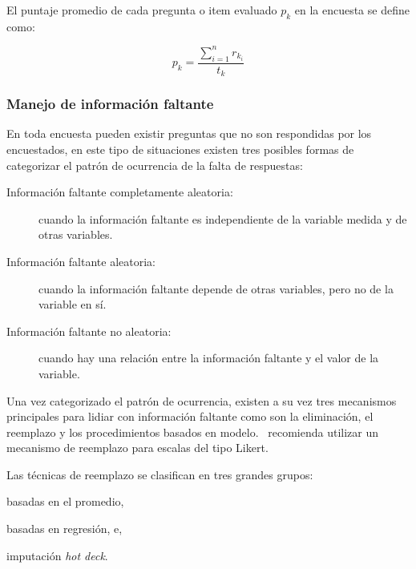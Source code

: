 El puntaje promedio de cada pregunta o item evaluado  $p_k$ en la encuesta se
define como:

\begin{equation}
p_k = \frac{\sum_{i=1}^n{r_{k_i}}}{t_k}
\end{equation}



\subsubsection{Manejo de información faltante}
\label{sec:informacion_faltante}

En toda encuesta pueden existir preguntas que no son respondidas por los encuestados, 
en este tipo de situaciones existen tres posibles formas de categorizar el 
patrón de ocurrencia de la falta de 
respuestas\cite{leite2010performance,tsikriktsis2005review}:

\begin{description}
    \item[Información faltante completamente aleatoria:] cuando la información
        faltante es independiente de la variable medida y de otras variables.
    \item[Información faltante aleatoria:] cuando la información faltante depende
        de otras variables, pero no de la variable en sí. 
    \item[Información faltante no aleatoria:] cuando hay una relación entre la
        información faltante y el valor de la variable.
\end{description}

Una vez categorizado el patrón de ocurrencia, existen a su vez tres
mecanismos~\cite{tsikriktsis2005review} principales para lidiar con información
faltante como son la eliminación, el reemplazo y los  procedimientos basados en
modelo.~\cite{tsikriktsis2005review} recomienda utilizar un mecanismo de
reemplazo para escalas del tipo Likert.

Las técnicas de reemplazo se clasifican en tres grandes
grupos\cite{tsikriktsis2005review}:
\begin{enumerate*}[label=\itshape\alph*\upshape.]
\item basadas en el promedio,
\item basadas en regresión, e,
\item imputación \emph{hot deck}.
\end{enumerate*}

